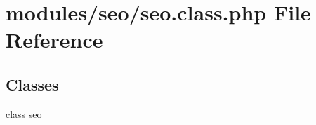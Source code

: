 \hypertarget{seo_8class_8php}{\section{modules/seo/seo.class.\-php File Reference}
\label{seo_8class_8php}
}
\subsection*{Classes}
\begin{DoxyCompactItemize}
\item 
class \hyperlink{classseo}{seo}
\end{DoxyCompactItemize}
